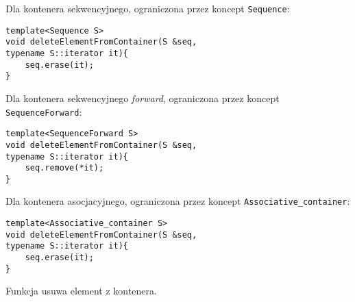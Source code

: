 \documentclass[11pt, a4paper]{article}
\begin{document}
\noindent Dla kontenera sekwencyjnego, ograniczona przez koncept \verb#Sequence#:
\begin{lstlisting}[frame=single]
template<Sequence S>
void deleteElementFromContainer(S &seq, 
typename S::iterator it){
    seq.erase(it);
}
\end{lstlisting}

\noindent Dla kontenera sekwencyjnego \emph{forward}, ograniczona przez koncept \verb#SequenceForward#:
\begin{lstlisting}[frame=single]
template<SequenceForward S>
void deleteElementFromContainer(S &seq, 
typename S::iterator it){
    seq.remove(*it);
}
\end{lstlisting}

\noindent Dla kontenera asocjacyjnego, ograniczona przez koncept \verb#Associative_container#:
\begin{lstlisting}[frame=single]
template<Associative_container S>
void deleteElementFromContainer(S &seq, 
typename S::iterator it){
    seq.erase(it);
}
\end{lstlisting}

\noindent Funkcja usuwa element z kontenera.
\end{document}
